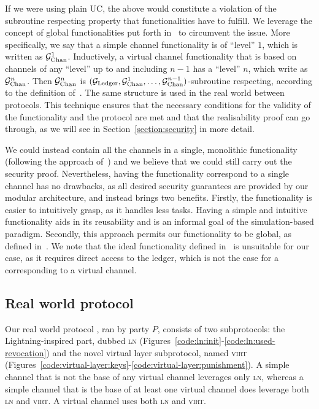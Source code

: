   If we were using plain UC, the above would constitute a violation of the
  subroutine respecting property that functionalities have to fulfill. We
  leverage the concept of global functionalities put forth
  in~\cite{DBLP:conf/tcc/BadertscherCHTZ20} to circumvent the issue. More
  specifically, we say that a simple channel functionality is of ``level'' $1$,
  which is written as $\mathcal{G}_{\mathrm{Chan}}^{1}$. Inductively, a virtual channel
  functionality that is based on channels of any ``level'' up to and including
  $n-1$ has a ``level'' $n$, which write as $\mathcal{G}_{\mathrm{Chan}}^{n}$. Then $\mathcal{G}_{\mathrm{Chan}}^{n}$
  is $(\mathcal{G}_{\mathrm{Ledger}}, \mathcal{G}_{\mathrm{Chan}}^{1}, \dots, \mathcal{G}_{\mathrm{Chan}}^{n-1})$-subroutine respecting,
  according to the definition of~\cite{DBLP:conf/tcc/BadertscherCHTZ20}. The
  same structure is used in the real world between protocols. This
  technique ensures that the necessary conditions for the validity of the
  functionality and the protocol are met and that the realisability proof can go
  through, as we will see in Section~\ref{section:security} in more detail.

  We could instead contain all the channels in a single, monolithic
  functionality (following the approach of~\cite{DBLP:conf/csfw/KiayiasL20}) and
  we believe that we could still carry out the security proof. Nevertheless,
  having the functionality correspond to a single channel has no drawbacks, as
  all desired security guarantees are provided by our modular architecture, and
  instead brings two benefits. Firstly, the functionality is easier to
  intuitively grasp, as it handles less tasks. Having a simple and intuitive
  functionality aids in its reusability and is an informal goal of the
  simulation-based paradigm. Secondly, this approach permits our functionality
  to be global, as defined in~\cite{DBLP:conf/tcc/BadertscherCHTZ20}.
  We note that the ideal functionality defined in~\cite{DBLP:journals/iacr/AumayrEEFHMMR20}
  is unsuitable for our case, as it requires direct access to the ledger, which
  is not the case for a \fchan corresponding to a virtual channel.

  \subsection{Real world protocol \pchan}
  \label{construction:real-world}
  Our real world protocol \pchan, ran by party $P$, consists of two
  subprotocols: the Lightning-inspired part, dubbed \textsc{ln}
  (Figures~\ref{code:ln:init}-\ref{code:ln:used-revocation}) and the novel
  virtual layer subprotocol, named \textsc{virt}
  (Figures~\ref{code:virtual-layer:keys}-\ref{code:virtual-layer:punishment}). A
  simple channel that is not the base of any virtual channel leverages only
  \textsc{ln}, whereas a simple channel that is the base of at least one virtual
  channel does leverage both \textsc{ln} and \textsc{virt}. A virtual channel
  uses both \textsc{ln} and \textsc{virt}.

